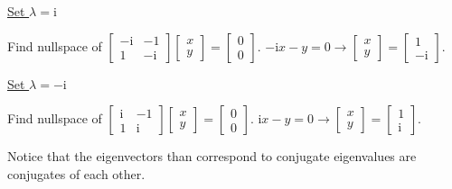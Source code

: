 \documentclass{article}
\newcommand{\mathi}{\mathrm{i}}
\begin{document}
\begin{enumerate}
  {\underline{Set $\lambda = \mathi$}}
  
  Find nullspace of $\left[\begin{array}{cc}
    - \mathi & - 1\\
    1 & - \mathi
  \end{array}\right]  \left[\begin{array}{c}
    x\\
    y
  \end{array}\right] = \left[\begin{array}{c}
    0\\
    0
  \end{array}\right]$. $- \mathi x - y = 0 \rightarrow \left[\begin{array}{c}
    x\\
    y
  \end{array}\right] = \left[\begin{array}{c}
    1\\
    - \mathi
  \end{array}\right]$.
  
  {\underline{Set $\lambda = - \mathi$}}
  
  Find nullspace of $\left[\begin{array}{cc}
    \mathi & - 1\\
    1 & \mathi
  \end{array}\right]  \left[\begin{array}{c}
    x\\
    y
  \end{array}\right] = \left[\begin{array}{c}
    0\\
    0
  \end{array}\right]$. $\mathi x - y = 0 \rightarrow \left[\begin{array}{c}
    x\\
    y
  \end{array}\right] = \left[\begin{array}{c}
    1\\
    \mathi
  \end{array}\right]$.
  
  Notice that the eigenvectors than correspond to conjugate eigenvalues are
  conjugates of each other.
  

\end{enumerate}
\end{document}
